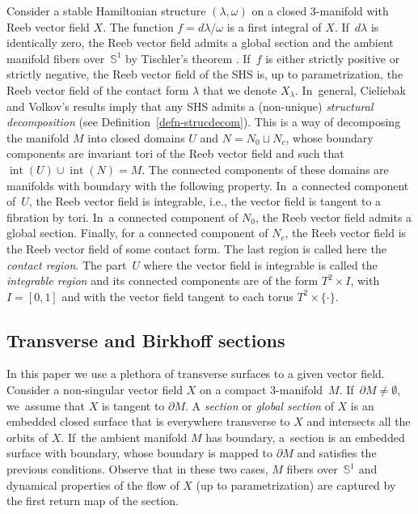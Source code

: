 \documentclass[11pt]{article}
\newcommand{\ie}{i.e.,\xspace}
\newcommand{\threemanifold}{$3$\nobreakdash-mani\-fold\xspace}
\theoremstyle{definition}
\begin{document}
Consider a stable Hamiltonian structure $(\lambda,\omega)$ on a closed \threemanifold with Reeb vector field $X$. The function $f=d\lambda/\omega$ is a first integral of $X$. If~$d\lambda$ is identically zero, the Reeb vector field admits a global section and the ambient manifold fibers over~$\mathbb{S}^1$ by Tischler's theorem \cite{Tis}. If~$f$ is either strictly positive or strictly negative, the Reeb vector field of the SHS is, up to parametrization, the Reeb vector field of the contact form $\lambda$ that we denote $X_\lambda$. In~general, Cieliebak and Volkov's results \cite{CV1} imply that any SHS admits a (non-unique) \emph{structural decomposition} (see Definition~\ref{defn-strucdecom}). This is a way of decomposing the manifold $M$ into closed domains $U$ and $N=N_0\sqcup N_c$, whose boundary components are invariant tori of the Reeb vector field and such that $\operatorname{int}(U)\cup \operatorname{int}(N)=M$. The connected components of these domains are manifolds with boundary with the following property. In~a connected component of~$U$, the Reeb vector field is integrable, \ie the vector field is tangent to a fibration by tori. In~a connected component of $N_0$, the Reeb vector field admits a global section. Finally, for a connected component of $N_c$, the Reeb vector field is the Reeb vector field of some contact form. The last region is called here the \textit{contact region}. The part~$U$ where the vector field is integrable is called the \textit{integrable region} and its connected components are of the form $T^2\times I$, with $I=[0,1]$ and with the vector field tangent to each torus $T^2\times \{\cdot \}$.

\subsection{Transverse and Birkhoff sections} In this paper we use a plethora of transverse surfaces to a given vector field. Consider a non-singular vector field $X$ on a compact \threemanifold~$M$. If~$\partial M\neq \emptyset$, we~assume that $X$ is tangent to $\partial M$. A \emph{section} or \emph{global section} of $X$ is an embedded closed surface that is everywhere transverse to $X$ and intersects all the orbits of $X$. If~the ambient manifold $M$ has boundary, a~section is an embedded surface with boundary, whose boundary is mapped to $\partial M$ and satisfies the previous conditions. Observe that in these two cases, $M$ fibers over~$\mathbb{S}^1$ and dynamical properties of the flow of $X$ (up to parametrization) are captured by the first return map of the section.
\end{document}
